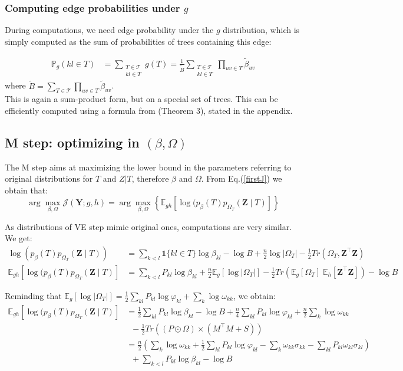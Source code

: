 \documentclass[11pt,a4paper]{article}
\newcommand{\argmax}{\arg\!\max}
\newcommand{\Ybf}{\boldsymbol{Y}}
\newcommand{\Zbf}{\boldsymbol{Z}}
\newcommand{\Esp}{\mathds{E}}
\begin{document}
\subsubsection{Computing edge probabilities under $g$}
During computations, we need edge probability under the $g$ distribution, which is simply computed as the sum of probabilities of trees containing this edge:

\begin{align*}
\mathds{P}_g(kl \in T)  &= \sum_{\substack{T  \in \mathcal{T} \\ kl \in T }} g(T) =\frac{1}{\widetilde{B}} \sum_{\substack{T  \in \mathcal{T} \\ kl \in T }} \prod_{uv \in T} \widetilde{\beta}_{uv}
\end{align*}
where $\displaystyle \widetilde{B}= \sum_{T \in \mathcal{T} }\prod_{uv \in T}  \widetilde{\beta}_{uv}$.\\

 This is again a sum-product form, but on a special set of trees. This can be efficiently computed using a formula from \citet{kirshner} (Theorem 3), stated in the appendix.
 
\subsection{M step: optimizing in $(\beta, \Omega)$}
 The M step aims at maximizing the lower bound in the parameters referring to original distributions for $T$ and $Z|T$, therefore $\beta$ and $\Omega$. From Eq.(\ref{firstJ}) we obtain that: 
$$ \argmax_{\beta, \Omega} \mathcal{J}(\Ybf ; g,h) =\argmax_{\beta, \Omega} \left\{ \Esp_{gh} [\log (p_\beta(T)p_{\Omega_T}(\Zbf\mid T) ]\right\} $$

As distributions of VE step mimic original ones, computations are very similar. We get:
\begin{align*}
\log (p_\beta(T)p_{\Omega_T}(\Zbf\mid T))  &= \sum_{k<l} \mathds{1}\{kl \in T\} \log \beta_{kl} - \log B + \frac{n}{2}\log |\Omega_T| - \frac{1}{2}Tr(\Omega_T,\Zbf^\intercal \Zbf)\\
\Esp_{gh} [\log (p_\beta(T)p_{\Omega_T}(\Zbf\mid T) ] &= \sum_{k<l} P_{kl} \log\beta_{kl} +\frac{n}{2} \Esp_g[\log |\Omega_T|] -\frac{1}{2} Tr(\Esp_g [\Omega_T] \; \Esp_h[\Zbf^\intercal \Zbf])- \log B
\end{align*}

Reminding that $\Esp_g[\log |\Omega_{T}|]= \frac{1}{2}\sum _{kl} P_{kl}  \log\varphi_{kl}+ \sum_k \log \omega_{kk}$,  we obtain:
\begin{align*}
\Esp_{gh} [\log (p_\beta(T)p_{\Omega_T}(\Zbf\mid T) ] &=\frac{1}{2}\sum_{kl} P_{kl} \log  \beta_{kl} - \log B + \frac{n}{4} \sum_{kl} P_{kl} \log\varphi_{kl} + \frac{n}{2}\sum_k \log \omega_{kk}\\
& \;\; - \frac{1}{2}Tr( (P \odot \Omega) \times (M^\intercal M +S))\\
&= \frac{n}{2}\left( \sum_k \log \omega_{kk}  + \frac{1}{2} \sum_{kl} P_{kl} \log \varphi_{kl} - \sum_{k} \omega_{kk} \sigma_{kk} - \sum_{kl} P_{kl} \omega_{kl} \sigma_{kl}\right)\\
& \;\; +\sum_{k<l} P_{kl} \log  \beta_{kl} - \log B 
\end{align*}
 
\end{document}
